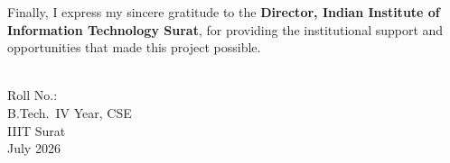 \vspace{0.2cm}

Finally, I express my sincere gratitude to the \textbf{Director, Indian Institute of Information Technology Surat}, for providing the institutional support and opportunities that made this project possible.

\vspace{1.4cm}

\begin{flushright}
\textbf{\myname}\\[4pt]
Roll No.: \myrollno\\[4pt]
B.Tech.\ IV Year, CSE\\[4pt]
IIIT Surat\\[4pt]
July 2026
\end{flushright}

\newpage